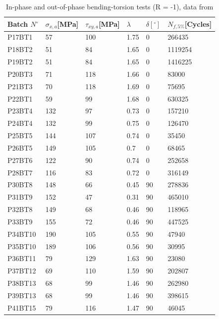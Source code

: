 \documentclass[3p,times,procedia,number]{elsarticle}
\begin{document}
\begin{table}[!h]
	\centering
	\begin{tabular}{|l|l|l|l|l|l|}
		\hline
		Batch $N^\circ$ & $\sigma_{x,a}${[}MPa{]} & $\tau_{xy,a}${[}MPa{]} & $\lambda$ & $\delta [^\circ]$ & $N_{f,5\%}${[}Cycles{]} \\ \hline
		P17BT1 & 57 & 100 & 1.75 & 0 & 266435 \\ \hline
		P18BT2 & 51 & 84 & 1.65 & 0 & 1119254 \\ \hline
		P19BT2 & 51 & 84 & 1.65 & 0 & 1416225 \\ \hline
		P20BT3 & 71 & 118 & 1.66 & 0 & 83000 \\ \hline
		P21BT3 & 70 & 118 & 1.69 & 0 & 75695 \\ \hline
		P22BT1 & 59 & 99 & 1.68 & 0 & 630325 \\ \hline
		P23BT4 & 132 & 97 & 0.73 & 0 & 157210 \\ \hline
		P24BT4 & 132 & 99 & 0.75 & 0 & 126470 \\ \hline
		P25BT5 & 144 & 107 & 0.74 & 0 & 35450 \\ \hline
		P26BT5 & 149 & 105 & 0.7 & 0 & 68465 \\ \hline
		P27BT6 & 122 & 90 & 0.74 & 0 & 252658 \\ \hline
		P28BT7 & 116 & 83 & 0.72 & 0 & 316149 \\ \hline
		P30BT8 & 148 & 66 & 0.45 & 90 & 278836 \\ \hline
		P31BT9 & 152 & 47 & 0.31 & 90 & 465010 \\ \hline
		P32BT8 & 149 & 68 & 0.46 & 90 & 118965 \\ \hline
		P33BT9 & 155 & 72 & 0.46 & 90 & 447525 \\ \hline
		P34BT10 & 190 & 105 & 0.55 & 90 & 47940 \\ \hline
		P35BT10 & 189 & 106 & 0.56 & 90 & 30995 \\ \hline
		P36BT11 & 79 & 129 & 1.63 & 90 & 23080 \\ \hline
		P37BT12 & 69 & 110 & 1.59 & 90 & 202807 \\ \hline
		P38BT13 & 68 & 99 & 1.46 & 90 & 262980 \\ \hline
		P39BT13 & 68 & 99 & 1.46 & 90 & 398615 \\ \hline
		P41BT15 & 79 & 116 & 1.47 & 90 & 46045 \\ \hline
	\end{tabular}
	\caption{In-phase and out-of-phase bending-torsion tests (R = -1), data from \cite{susmel2003multiaxial}}
	\label{tab.AL6082T6BT2D}
\end{table}
\end{document}
